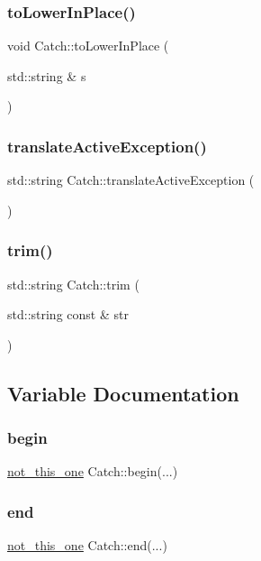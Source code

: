 \subsubsection{\texorpdfstring{toLowerInPlace()}{toLowerInPlace()}}
{\footnotesize\ttfamily void Catch\+::to\+Lower\+In\+Place (\begin{DoxyParamCaption}\item[{std\+::string \&}]{s }\end{DoxyParamCaption})}

\mbox{\label{namespace_catch_adafff91485eeeeb9e9333f317cc0e3b1}} 
\subsubsection{\texorpdfstring{translateActiveException()}{translateActiveException()}}
{\footnotesize\ttfamily std\+::string Catch\+::translate\+Active\+Exception (\begin{DoxyParamCaption}{ }\end{DoxyParamCaption})}

\mbox{\label{namespace_catch_a084108b47f37d8bfd5db51c50c7451b3}} 
\subsubsection{\texorpdfstring{trim()}{trim()}}
{\footnotesize\ttfamily std\+::string Catch\+::trim (\begin{DoxyParamCaption}\item[{std\+::string const \&}]{str }\end{DoxyParamCaption})}



\subsection{Variable Documentation}
\mbox{\label{namespace_catch_ac7ccff5c186bffa3b448b218ecf15956}} 
\subsubsection{\texorpdfstring{begin}{begin}}
{\footnotesize\ttfamily \mbox{\hyperlink{struct_catch_1_1not__this__one}{not\+\_\+this\+\_\+one}} Catch\+::begin(...)}

\mbox{\label{namespace_catch_a71fef6a57614eb2d9751f8586ff6de6a}} 
\subsubsection{\texorpdfstring{end}{end}}
{\footnotesize\ttfamily \mbox{\hyperlink{struct_catch_1_1not__this__one}{not\+\_\+this\+\_\+one}} Catch\+::end(...)}

